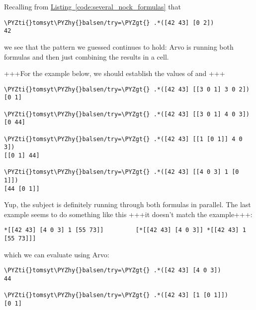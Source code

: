 Recalling from \hyperref[code:several_nock_formulas]{Listing~\ref{code:several_nock_formulas}} that

\begin{framed_shaded}
\begin{Verbatim}[fontsize=\relsize{-2.5},commandchars=\\\{\}]
\PYZti{}tomsyt\PYZhy{}balsen/try=\PYZgt{} .*([42 43] [0 2])
42
\end{Verbatim}
\end{framed_shaded}

we see that the pattern we guessed continues to hold: Arvo is running both formulas and then just combining the results in a cell.

+++For the example below, we should establish the values of  and +++

\begin{framed_shaded}
\begin{Verbatim}[fontsize=\relsize{-2.5},commandchars=\\\{\}]
\PYZti{}tomsyt\PYZhy{}balsen/try=\PYZgt{} .*([42 43] [[3 0 1] 3 0 2])
[0 1]

\PYZti{}tomsyt\PYZhy{}balsen/try=\PYZgt{} .*([42 43] [[3 0 1] 4 0 3])
[0 44]

\PYZti{}tomsyt\PYZhy{}balsen/try=\PYZgt{} .*([42 43] [[1 [0 1]] 4 0 3])
[[0 1] 44]

\PYZti{}tomsyt\PYZhy{}balsen/try=\PYZgt{} .*([42 43] [[4 0 3] 1 [0 1]])
[44 [0 1]]
\end{Verbatim}
\end{framed_shaded}

Yup, the subject is definitely running through both formulas in parallel. The
last example seems to do something like this +++it doesn't match the example+++:

\begin{framed_shaded}
\begin{Verbatim}[fontsize=\relsize{-2.5},commandchars=\\\{\}]
*[[42 43] [4 0 3] 1 [55 73]]         [*[[42 43] [4 0 3]] *[[42 43] 1 [55 73]]]
\end{Verbatim}
\end{framed_shaded}

which we can evaluate using Arvo:

\begin{framed_shaded}
\begin{Verbatim}[fontsize=\relsize{-2.5},commandchars=\\\{\}]
\PYZti{}tomsyt\PYZhy{}balsen/try=\PYZgt{} .*([42 43] [4 0 3])
44

\PYZti{}tomsyt\PYZhy{}balsen/try=\PYZgt{} .*([42 43] [1 [0 1]])
[0 1]
\end{Verbatim}
\end{framed_shaded}

